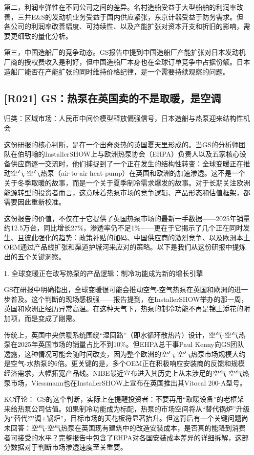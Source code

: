 \documentclass[11pt]{ctexart}
\begin{document}
第二，利润率弹性在不同公司之间的差异。名村造船受益于大型船舶的利润率改善，三井E\&S的发动机业务受益于国内供应紧张，东京计器受益于防务需求。但各公司的利润率改善幅度、可持续性、以及产能扩张对资本开支和折旧的影响，需要更细致的量化分析。

第三，中国造船厂的竞争动态。GS报告中提到中国造船厂产能扩张对日本发动机厂商的授权费收入是利好，但中国造船厂本身也在全球订单竞争中占据份额。日本造船厂能否在产能扩张的同时维持价格纪律，是一个需要持续观察的问题。

\subsection{[R021] GS：热泵在英国卖的不是取暖，是空调}
{\small\color{refgray}归类：区域市场：人民币中间价模型释放偏强信号，日本造船与热泵迎来结构性机会}

这份研报的核心判断，是在一个出奇炎热的英国夏天里形成的。当GS的分析师团队在伯明翰的InstallerSHOW上与欧洲热泵协会（EHPA）负责人以及五家核心设备供应商逐一交流时，他们捕捉到了一个正在发生的结构性转变：全球变暖正在推动空气-空气热泵（air-to-air heat pump）在英国和欧洲的加速渗透。这不是一个关于冬季取暖的故事，而是一个关于夏季制冷需求爆发的故事。对于长期关注欧洲能源转型的投资者而言，这意味着热泵市场的竞争逻辑、产品形态和估值框架，都需要因此重新校准。

这份报告的价值，不仅在于它提供了英国热泵市场的最新一手数据——2025年销量约12.5万台，同比增长27\%，渗透率仍不足1\%——更在于它揭示了几个正在同时发生、且彼此强化的趋势：政策补贴的加码、中国供应商的激烈竞争、以及欧洲本土OEM通过产品线扩张和渠道护城河来应对的策略。以下是我们从这份研报中提炼出的五个关键洞察。

1. 全球变暖正在改写热泵的产品逻辑：制冷功能成为新的增长引擎

GS在研报中明确指出，全球变暖很可能会推动空气-空气热泵在英国和欧洲的进一步普及。这个判断的现场感极强——报告提到，在InstallerSHOW举办的那一周，英国和欧洲正经历异常高温。在这种天气下，热泵的制冷功能不再是锦上添花的附加项，而是变成了刚需。

传统上，英国中央供暖系统围绕“湿回路”（即水循环散热片）设计，空气-空气热泵在2025年英国市场的销量占比不到10\%。但EHPA总干事Paul Kenny向GS团队透露，这种情况可能会随时间改变，因为整个欧洲的空气-空气热泵市场规模大约是空气-水热泵的6倍。更关键的是，多个OEM正在积极响应安装商的反馈和规模经济需求，大幅拓宽产品线。NIBE最近宣布进入其历史上从未涉足的空气-空气热泵市场，Viessmann也在InstallerSHOW上宣布在英国推出其Vitocal 200-A型号。

KC评论： GS的这个判断，实际上在提醒投资者：不要再用“取暖设备”的老框架来给热泵公司估值。如果制冷功能成为标配，热泵的市场空间将从“替代锅炉”升级为“替代空调+锅炉”，目标市场的天花板将显著抬升。但这背后有一个关键问题尚未回答：空气-空气热泵在英国现有建筑中的改造安装成本，是否真的能降到消费者可接受的水平？完整报告中包含了EHPA对各国安装成本差异的详细拆解，这部分数据对于判断市场渗透速度至关重要。
\end{document}
